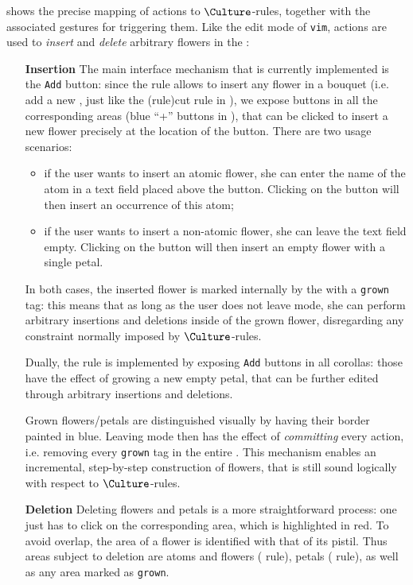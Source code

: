 \begin{scope}
 shows the precise mapping of \Edit actions to
$\Culture$-rules, together with the associated gestures for triggering them.
Like the edit mode of \texttt{vim}, \Edit actions are used to \emph{insert} and
\emph{delete} arbitrary flowers in the :
\begin{itemize}
  \item[\textbf{Insertion}] The main interface mechanism that is currently
  implemented is the \texttt{Add} button: since the  rule allows to
  insert any flower in a  bouquet (i.e. add a new , just like the
  \kl(rule){cut} rule in ), we expose buttons in all the corresponding
  areas (blue ``+'' buttons in ), that can be
  clicked to insert a new flower precisely at the location of the button. There
  are two usage scenarios:
  \begin{itemize}
    \item if the user wants to insert an atomic flower, she can enter the name
    of the atom in a text field placed above the button. Clicking on the button
    will then insert an occurrence of this atom;
    \item if the user wants to insert a non-atomic flower, she can leave the
    text field empty. Clicking on the button will then insert an empty flower
    with a single petal.
  \end{itemize}
  In both cases, the inserted flower is marked internally by the 
  with a \texttt{grown} tag: this means that as long as the user does not leave
  \Edit mode, she can perform arbitrary insertions and deletions inside of the
  grown flower, disregarding any  constraint normally imposed by
  $\Culture$-rules.
  
  Dually, the  rule is implemented by exposing \texttt{Add} buttons in
  all  corollas: those have the effect of growing a new empty petal,
  that can be further edited through arbitrary insertions and deletions.

  Grown flowers/petals are distinguished visually by having their border painted
  in blue. Leaving \Edit mode then has the effect of \emph{committing} every
  \Edit action, i.e. removing every \texttt{grown} tag in the entire . This
  mechanism enables an incremental, step-by-step construction of flowers, that
  is still sound logically with respect to $\Culture$-rules.

  \item[\textbf{Deletion}] Deleting flowers and petals is a more straightforward
  process: one just has to click on the corresponding area, which is highlighted
  in red. To avoid overlap, the area of a flower is identified with that of its
  pistil. Thus areas subject to deletion are  atoms and flowers
  ( rule),  petals ( rule), as well as any area
  marked as \texttt{grown}.
\end{itemize}


\end{scope}
